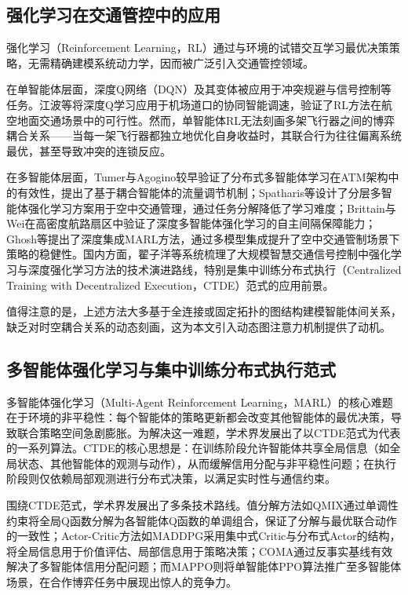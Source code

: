 \documentclass[12pt,a4paper,UTF8]{ctexbook}
\begin{document}
\subsection{强化学习在交通管控中的应用}

强化学习（Reinforcement Learning，RL）通过与环境的试错交互学习最优决策策略，无需精确建模系统动力学，因而被广泛引入交通管控领域。

在单智能体层面，深度Q网络（DQN）及其变体被应用于冲突规避与信号控制等任务\cite{ref12,ref15,ref16,ref17,ref18,ref19,ref20,ref21,ref22}。江波等\cite{ref21}将深度Q学习应用于机场道口的协同智能调速，验证了RL方法在航空地面交通场景中的可行性。然而，单智能体RL无法刻画多架飞行器之间的博弈耦合关系——当每一架飞行器都独立地优化自身收益时，其联合行为往往偏离系统最优，甚至导致冲突的连锁反应。

在多智能体层面，Tumer与Agogino\cite{ref7,ref14,ref24}较早验证了分布式多智能体学习在ATM架构中的有效性，提出了基于耦合智能体的流量调节机制；Spatharis等\cite{ref11}设计了分层多智能体强化学习方案用于空中交通管理，通过任务分解降低了学习难度；Brittain与Wei\cite{ref8}在高密度航路扇区中验证了深度多智能体强化学习的自主间隔保障能力；Ghosh等\cite{ref9}提出了深度集成MARL方法，通过多模型集成提升了空中交通管制场景下策略的稳健性。国内方面，翟子洋等\cite{ref13}系统梳理了大规模智慧交通信号控制中强化学习与深度强化学习方法的技术演进路线，特别是集中训练分布式执行（Centralized Training with Decentralized Execution，CTDE）范式的应用前景。

值得注意的是，上述方法大多基于全连接或固定拓扑的图结构建模智能体间关系，缺乏对时空耦合关系的动态刻画，这为本文引入动态图注意力机制提供了动机。

\subsection{多智能体强化学习与集中训练分布式执行范式}

多智能体强化学习（Multi-Agent Reinforcement Learning，MARL）的核心难题在于环境的非平稳性：每个智能体的策略更新都会改变其他智能体的最优决策，导致联合策略空间急剧膨胀。为解决这一难题，学术界发展出了以CTDE范式为代表的一系列算法。CTDE的核心思想是：在训练阶段允许智能体共享全局信息（如全局状态、其他智能体的观测与动作），从而缓解信用分配与非平稳性问题；在执行阶段则仅依赖局部观测进行分布式决策，以满足实时性与通信约束。

围绕CTDE范式，学术界发展出了多条技术路线。值分解方法如QMIX\cite{ref33}通过单调性约束将全局Q函数分解为各智能体Q函数的单调组合，保证了分解与最优联合动作的一致性；Actor-Critic方法如MADDPG\cite{ref34}采用集中式Critic与分布式Actor的结构，将全局信息用于价值评估、局部信息用于策略决策；COMA\cite{ref35}通过反事实基线有效解决了多智能体信用分配问题；而MAPPO\cite{ref36}则将单智能体PPO算法推广至多智能体场景，在合作博弈任务中展现出惊人的竞争力。
\end{document}
